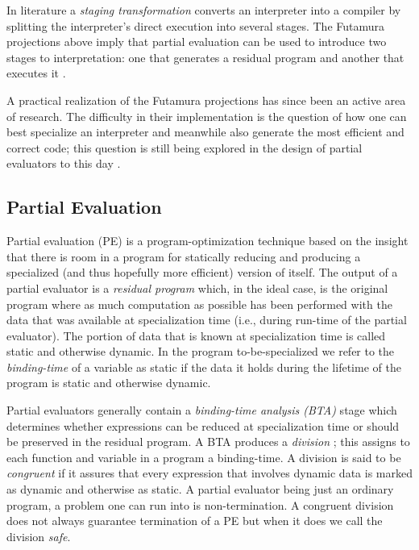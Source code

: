 \documentclass[a4paper,12pt,twoside,openright]{report}
\theoremstyle{definition}
\begin{document}
In literature a \textit{staging transformation} \cite{jorring1986compilers,brady2006verified}  converts an interpreter into a compiler by splitting the interpreter's direct execution into several stages. The Futamura projections above imply that partial evaluation can be used to introduce two stages to interpretation: one that generates a residual program and another that executes it \cite{jones1993partial}.

A practical realization of the Futamura projections has since been an active area of research. The difficulty in their implementation is the question of how one can best specialize an interpreter and meanwhile also generate the most efficient and correct code; this question is still being explored in the design of partial evaluators to this day \cite{jones1988challenging}.

\subsection{Partial Evaluation}\label{subsec:pe}
Partial evaluation (PE) is a program-optimization technique based on the insight that there is room in a program for statically reducing and producing a specialized (and thus hopefully more efficient) version of itself. The output of a partial evaluator is a \textit{residual program} which, in the ideal case, is the original program where as much computation as possible has been performed with the data that was available at specialization time (i.e., during run-time of the partial evaluator). The portion of data that is known at specialization time is called static and otherwise dynamic. In the program to-be-specialized we refer to the \textit{binding-time} of a variable as static if the data it holds during the lifetime of the program is static and otherwise dynamic.

Partial evaluators generally contain a \textit{binding-time analysis (BTA)} stage which determines whether expressions can be reduced at specialization time or should be preserved in the residual program. A BTA produces a \textit{division} \cite{jones1993partial}; this assigns to each function and variable in a program a binding-time. A division is said to be \textit{congruent} if it assures that every expression that involves dynamic data is marked as dynamic and otherwise as static. A partial evaluator being just an ordinary program, a problem one can run into is non-termination. A congruent division does not always guarantee termination of a PE but when it does we call the division \textit{safe}.
\end{document}
